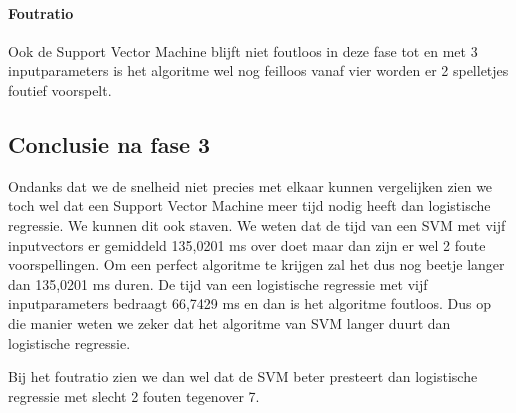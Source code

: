 \paragraph{Foutratio}
Ook de Support Vector Machine blijft niet foutloos in deze fase tot en met 3 inputparameters is het algoritme wel nog feilloos vanaf vier worden er 2 spelletjes foutief voorspelt.  

\subsection{Conclusie na fase 3}
Ondanks dat we de snelheid niet precies met elkaar kunnen vergelijken zien we toch wel dat een Support Vector Machine meer tijd nodig heeft dan logistische regressie. We kunnen dit ook staven. We weten dat de tijd van een SVM met vijf inputvectors er gemiddeld 135,0201 ms over doet maar dan zijn er wel 2 foute voorspellingen. Om een perfect algoritme te krijgen zal het dus nog beetje langer dan 135,0201 ms duren. De tijd van een logistische regressie met vijf inputparameters bedraagt 66,7429 ms en dan is het algoritme foutloos. Dus op die manier weten we zeker dat het algoritme van SVM langer duurt dan logistische regressie. 

Bij het foutratio zien we dan wel dat de SVM beter presteert dan logistische regressie met slecht 2 fouten tegenover 7. 

 